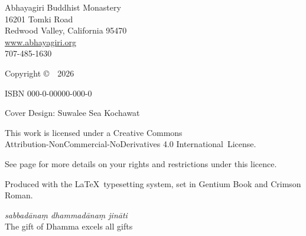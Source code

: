 
\cleartoverso
\thispagestyle{empty}

{\copyrightsize
\centering
\setlength{\parindent}{0pt}%
\setlength{\parskip}{0.8\baselineskip}%


Abhayagiri Buddhist Monastery\\
16201 Tomki Road\\
Redwood Valley, California 95470\\
\href{http://www.abhayagiri.org}{www.abhayagiri.org}\\
707-485-1630

Copyright \copyright\ \thePublisher\ 2026

ISBN 000-0-00000-000-0

Cover Design: Suwalee Sea Kochawat


\vfill

{\footnotesize


This work is licensed under a Creative Commons\\
Attribution-NonCommercial-NoDerivatives 4.0 International~License.

See page \pageref{copyright-details} for more details on your rights and restrictions under this licence.

Produced with the \LaTeX\ typesetting system, set in Gentium Book and Crimson Roman.

\theEditionInfo

\vspace{1\baselineskip}

\emph{sabbadānaṃ dhammadānaṃ jināti}\\
The gift of Dhamma excels all gifts

}}